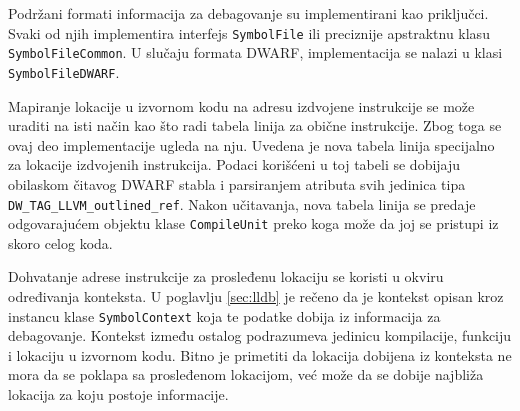 \documentclass[12pt,oneside]{memoir}
\begin{document}
Podržani formati informacija za debagovanje su implementirani kao priključci.
Svaki od njih implementira interfejs \verb|SymbolFile| ili preciznije apstraktnu klasu \verb|SymbolFileCommon|.
U slučaju formata DWARF, implementacija se nalazi u klasi \verb|SymbolFileDWARF|.


Mapiranje lokacije u izvornom kodu na adresu izdvojene instrukcije se može uraditi na isti način kao što radi tabela linija za obične instrukcije.
Zbog toga se ovaj deo implementacije ugleda na nju.
Uvedena je nova tabela linija specijalno za lokacije izdvojenih instrukcija.
Podaci korišćeni u toj tabeli se dobijaju obilaskom čitavog DWARF stabla i parsiranjem atributa svih jedinica tipa \verb|DW_TAG_LLVM_outlined_ref|.
Nakon učitavanja, nova tabela linija se predaje odgovarajućem objektu klase \verb|CompileUnit| preko koga može da joj se pristupi iz skoro celog koda.

Dohvatanje adrese instrukcije za prosleđenu lokaciju se koristi u okviru određivanja konteksta.
U poglavlju \ref{sec:lldb} je rečeno da je kontekst opisan kroz instancu klase \verb|SymbolContext| koja te podatke dobija iz informacija za debagovanje.
Kontekst između ostalog podrazumeva jedinicu kompilacije, funkciju i lokaciju u izvornom kodu.
Bitno je primetiti da lokacija dobijena iz konteksta ne mora da se poklapa sa prosleđenom lokacijom, već može da se dobije najbliža lokacija za koju postoje informacije.
\end{document}
